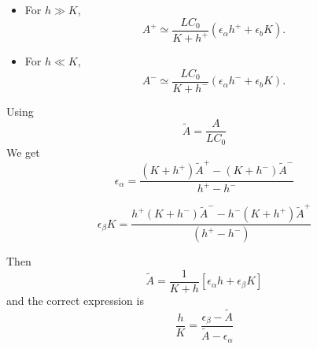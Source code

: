 \documentclass[aps]{revtex4}
\begin{document}
\begin{itemize}
\item For $h\gg K$, 
\begin{equation}
	A^+ \simeq \dfrac{L C_0}{K+h^+} \left( \epsilon_\alpha h^+ + \epsilon_b K\right).
\end{equation}
\item For $h\ll K$,
\begin{equation}
	A^- \simeq \dfrac{L C_0}{K+h^-} \left( \epsilon_\alpha h^- + \epsilon_b K\right).
\end{equation}
\end{itemize}
Using
$$
	\tilde{A} = \dfrac{A}{L C_0}
$$
We get
\begin{equation}
		\epsilon_\alpha = 
		\dfrac
		{
		(K+h^+) \tilde{A}^+ - (K+h^-) \tilde{A}^-
		}
		{
		h^+ - h^-
		} \end{equation}

\begin{equation}
		\epsilon_\beta K = 
		\dfrac
		{
			h^+(K+h^-) \tilde{A}^- - h^-(K+h^+) \tilde{A}^+ 
		}
		{
			\left(h^+ - h^-\right)
		}
\end{equation}

Then
\begin{equation}
	\tilde{A} = \dfrac{1}{K+h}
	 \left[ 
	 \epsilon_\alpha h + \epsilon_\beta K 
	 \right]
\end{equation}
and the correct expression is
\begin{equation}
	\dfrac{h}{K} =  \dfrac{\epsilon_\beta - \tilde{A}}{\tilde{A}-\epsilon_\alpha}
\end{equation}
\end{document}
